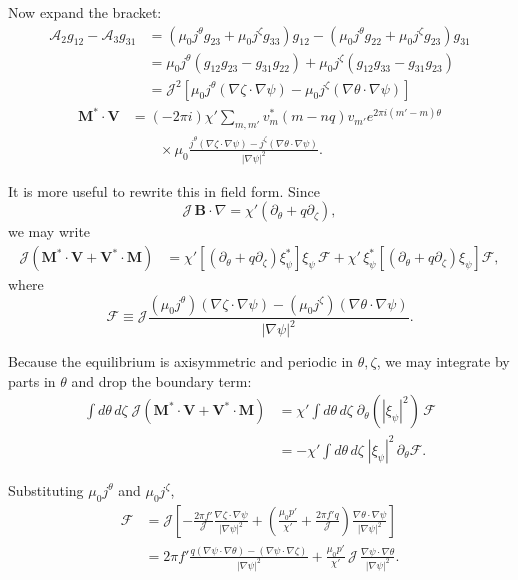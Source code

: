 \documentclass[10pt,a4paper]{article}
\numberwithin{equation}{section}
\begin{document}
Now expand the bracket:
\begin{align}
\mathcal A_2 g_{12}-\mathcal A_3 g_{31}
&=
(\mu_0j^\theta g_{23}+\mu_0j^\zeta g_{33})g_{12}
-
(\mu_0j^\theta g_{22}+\mu_0j^\zeta g_{23})g_{31} \\
&=
\mu_0j^\theta(g_{12}g_{23}-g_{31}g_{22})
+
\mu_0j^\zeta(g_{12}g_{33}-g_{31}g_{23}) \\
&=
\mathcal J^2
\left[
\mu_0j^\theta(\nabla\zeta\cdot\nabla\psi)
-
\mu_0j^\zeta(\nabla\theta\cdot\nabla\psi)
\right]
\end{align}
\begin{equation}
\boxed{
\begin{aligned}
\mathbf M^*\cdot\mathbf V
&=
(-2\pi i)\chi'
\sum_{m,m'}
v_m^*(m-nq)v_{m'}e^{2\pi i(m'-m)\theta} \\
&\qquad\times
\mu_0
\frac{
j^\theta(\nabla\zeta\cdot\nabla\psi)
-
j^\zeta(\nabla\theta\cdot\nabla\psi)
}{
|\nabla\psi|^2
}.
\end{aligned}
}
\end{equation}

It is more useful to rewrite this in field form. Since
\begin{equation}
\mathcal J\,\mathbf B\cdot\nabla
=
\chi'\left(\partial_\theta+q\partial_\zeta\right),
\end{equation}
we may write
\begin{align}
\mathcal J(\mathbf M^*\cdot\mathbf V+\mathbf V^*\cdot\mathbf M)
&=
\chi'
\left[
(\partial_\theta+q\partial_\zeta)\xi_\psi^*
\right]
\xi_\psi\,
\mathcal F
+
\chi'\,
\xi_\psi^*
\left[
(\partial_\theta+q\partial_\zeta)\xi_\psi
\right]\mathcal F,
\end{align}
where
\begin{equation}
\mathcal F
\equiv
\mathcal J
\frac{
(\mu_0 j^\theta)(\nabla\zeta\cdot\nabla\psi)
-
(\mu_0 j^\zeta)(\nabla\theta\cdot\nabla\psi)
}{
|\nabla\psi|^2
}.
\end{equation}

Because the equilibrium is axisymmetric and periodic in $\theta,\zeta$, we may integrate by parts in $\theta$ and drop the boundary term:
\begin{align}
\int d\theta\,d\zeta\;\mathcal J(\mathbf M^*\cdot\mathbf V+\mathbf V^*\cdot\mathbf M)
&= 
\chi'\int d\theta\,d\zeta\;
\partial_\theta(|\xi_\psi|^2)\,\mathcal F \\
&=
-\chi' \int d\theta\,d\zeta\;
|\xi_\psi|^2\,\partial_\theta \mathcal F.
\end{align}

Substituting $\mu_0 j^\theta$ and $\mu_0 j^\zeta$,
\begin{align}
\mathcal F
&=
\mathcal J
\left[
-\frac{2\pi f'}{\mathcal J}
\frac{\nabla\zeta\cdot\nabla\psi}{|\nabla\psi|^2}
+
\left(
\frac{\mu_0p'}{\chi'}
+
\frac{2\pi f'q}{\mathcal J}
\right)
\frac{\nabla\theta\cdot\nabla\psi}{|\nabla\psi|^2}
\right] \\
&=
2\pi f'
\frac{
q(\nabla\psi\cdot\nabla\theta)-(\nabla\psi\cdot\nabla\zeta)
}{
|\nabla\psi|^2
}
+
\frac{\mu_0p'}{\chi'}\,
\mathcal J\,
\frac{\nabla\psi\cdot\nabla\theta}{|\nabla\psi|^2}.
\end{align}
\end{document}
